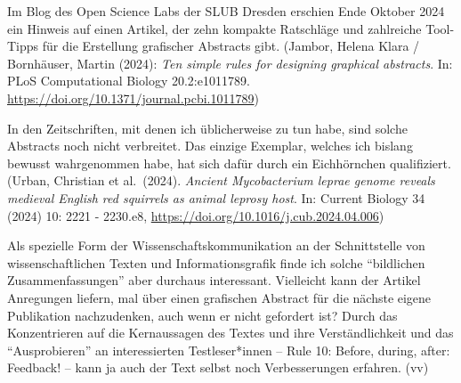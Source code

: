 \documentclass[a4paper,
fontsize=11pt,
oneside,
numbers=noperiodatend,
parskip=half-,
bibliography=totoc,
final
]{scrartcl}
\begin{document}
Im Blog des Open Science Labs der SLUB Dresden erschien Ende Oktober
2024 ein Hinweis auf einen Artikel, der zehn kompakte Ratschläge und
zahlreiche Tool-Tipps für die Erstellung grafischer Abstracts gibt.
(Jambor, Helena Klara / Bornhäuser, Martin (2024): \emph{Ten simple
rules for designing graphical abstracts}. In: PLoS Computational Biology
20.2:e1011789. \url{https://doi.org/10.1371/journal.pcbi.1011789})

In den Zeitschriften, mit denen ich üblicherweise zu tun habe, sind
solche Abstracts noch nicht verbreitet. Das einzige Exemplar, welches
ich bislang bewusst wahrgenommen habe, hat sich dafür durch ein
Eichhörnchen qualifiziert. (Urban, Christian et al.~(2024).
\emph{Ancient Mycobacterium leprae genome reveals medieval English red
squirrels as animal leprosy host}. In: Current Biology 34 (2024) 10:
2221 - 2230.e8, \url{https://doi.org/10.1016/j.cub.2024.04.006})

Als spezielle Form der Wissenschaftskommunikation an der Schnittstelle
von wissenschaftlichen Texten und Informationsgrafik finde ich solche
``bildlichen Zusammenfassungen'' aber durchaus interessant. Vielleicht
kann der Artikel Anregungen liefern, mal über einen grafischen Abstract
für die nächste eigene Publikation nachzudenken, auch wenn er nicht
gefordert ist? Durch das Konzentrieren auf die Kernaussagen des Textes
und ihre Verständlichkeit und das ``Ausprobieren'' an interessierten
Testleser*innen -- Rule 10: Before, during, after: Feedback! -- kann ja
auch der Text selbst noch Verbesserungen erfahren. (vv)

\end{document}
